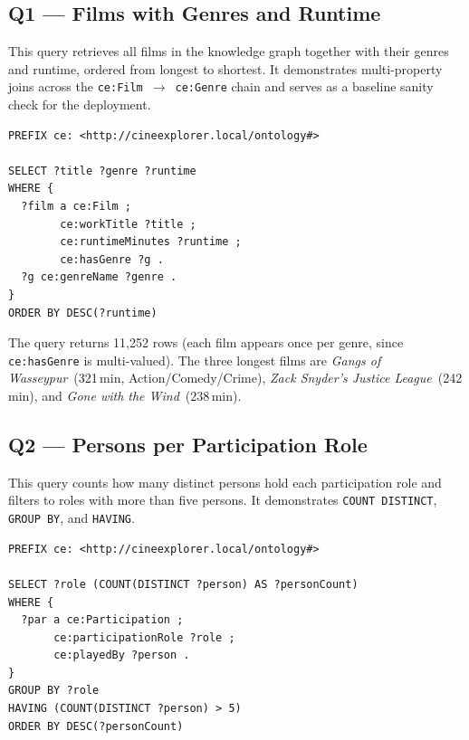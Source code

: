\subsection{Q1 — Films with Genres and Runtime}

This query retrieves all films in the knowledge graph together with their genres and runtime, ordered from longest to shortest. It demonstrates multi-property joins across the \texttt{ce:Film}~$\to$~\texttt{ce:Genre} chain and serves as a baseline sanity check for the deployment.

\begin{lstlisting}[language=SPARQL]
PREFIX ce: <http://cineexplorer.local/ontology#>

SELECT ?title ?genre ?runtime
WHERE {
  ?film a ce:Film ;
        ce:workTitle ?title ;
        ce:runtimeMinutes ?runtime ;
        ce:hasGenre ?g .
  ?g ce:genreName ?genre .
}
ORDER BY DESC(?runtime)
\end{lstlisting}

The query returns 11{,}252 rows (each film appears once per genre, since \texttt{ce:hasGenre} is multi-valued). The three longest films are \emph{Gangs of Wasseypur}~(321\,min, Action/Comedy/Crime), \emph{Zack Snyder's Justice League}~(242\,min), and \emph{Gone with the Wind}~(238\,min).

\subsection{Q2 — Persons per Participation Role}

This query counts how many distinct persons hold each participation role and filters to roles with more than five persons. It demonstrates \texttt{COUNT DISTINCT}, \texttt{GROUP BY}, and \texttt{HAVING}.

\begin{lstlisting}[language=SPARQL]
PREFIX ce: <http://cineexplorer.local/ontology#>

SELECT ?role (COUNT(DISTINCT ?person) AS ?personCount)
WHERE {
  ?par a ce:Participation ;
       ce:participationRole ?role ;
       ce:playedBy ?person .
}
GROUP BY ?role
HAVING (COUNT(DISTINCT ?person) > 5)
ORDER BY DESC(?personCount)
\end{lstlisting}

